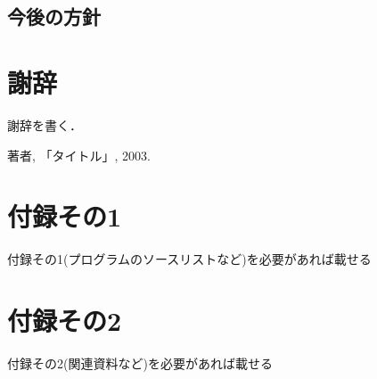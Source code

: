 \documentclass{funthesis}
\begin{document}

\section{今後の方針}



\chapter*{謝辞}

謝辞を書く．


\begin{thebibliography}{9}
  著者, 「タイトル」, 2003.
\end{thebibliography}


\appendix

\chapter*{付録その1} %

付録その1(プログラムのソースリストなど)を必要があれば載せる

\chapter*{付録その2}

付録その2(関連資料など)を必要があれば載せる

\listoffigures

\listoftables
\end{document}
